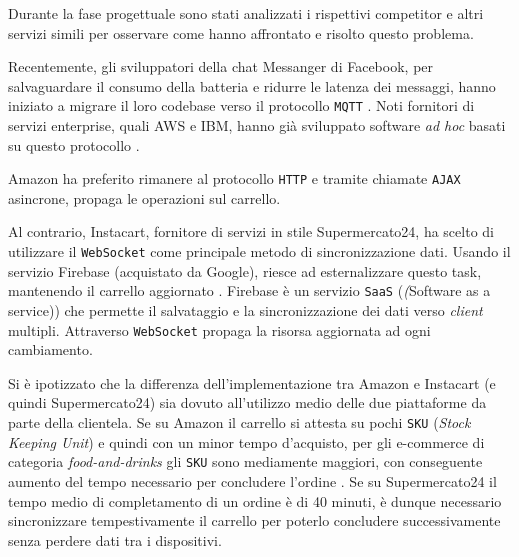 Durante la fase progettuale sono stati analizzati i rispettivi competitor e altri servizi simili per osservare come hanno affrontato e risolto questo problema.

Recentemente, gli sviluppatori della chat Messanger di Facebook, per salvaguardare il consumo della batteria e ridurre le latenza dei messaggi, hanno iniziato a migrare il loro codebase verso il protocollo \verb+MQTT+ \cite{Facebook}.
Noti fornitori di servizi enterprise, quali AWS e IBM, hanno già sviluppato software \textit{ad hoc} basati su questo protocollo \cite{Ibm, Aws}.

Amazon ha preferito rimanere al protocollo \verb+HTTP+ e tramite chiamate \verb+AJAX+ asincrone, propaga le operazioni sul carrello.

Al contrario, Instacart, fornitore di servizi in stile Supermercato24, ha scelto di utilizzare il \verb+WebSocket+ come principale metodo di sincronizzazione dati.
Usando il servizio Firebase (acquistato da Google), riesce ad esternalizzare questo task, mantenendo il carrello aggiornato \cite{Instacart}.
Firebase è un servizio \verb+SaaS+ (\textit(Software as a service)) che permette il salvataggio e la sincronizzazione dei dati verso \textit{client} multipli.
Attraverso \verb+WebSocket+ propaga la risorsa aggiornata ad ogni cambiamento.

Si è ipotizzato che la differenza dell'implementazione tra Amazon e Instacart (e quindi Supermercato24) sia dovuto all'utilizzo medio delle due piattaforme da parte della clientela.
Se su Amazon il carrello si attesta su pochi \verb+SKU+ (\textit{Stock Keeping Unit}) e quindi con un minor tempo d'acquisto, per gli e-commerce di categoria \textit{food-and-drinks} gli \verb+SKU+ sono mediamente maggiori, con conseguente aumento del tempo necessario per concludere l'ordine \cite{InstacartAnalysis}.
Se su Supermercato24 il tempo medio di completamento di un ordine è di 40 minuti, è dunque necessario sincronizzare tempestivamente il carrello per poterlo concludere successivamente senza perdere dati tra i dispositivi.
